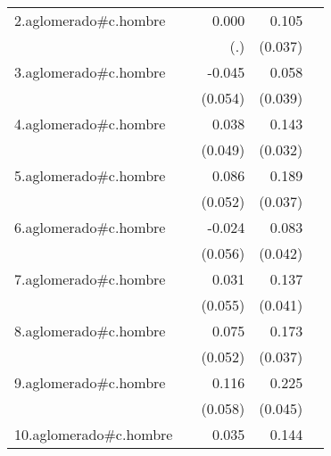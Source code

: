 {\begin{longtable}{l*{4}{D{.}{.}{-1}}}
\addlinespace
2.aglomerado#c.hombre&                     &       0.000         &       0.105\sym{**} &                     \\
            &                     &         (.)         &     (0.037)         &                     \\
\addlinespace
3.aglomerado#c.hombre&                     &      -0.045         &       0.058         &                     \\
            &                     &     (0.054)         &     (0.039)         &                     \\
\addlinespace
4.aglomerado#c.hombre&                     &       0.038         &       0.143\sym{***}&                     \\
            &                     &     (0.049)         &     (0.032)         &                     \\
\addlinespace
5.aglomerado#c.hombre&                     &       0.086         &       0.189\sym{***}&                     \\
            &                     &     (0.052)         &     (0.037)         &                     \\
\addlinespace
6.aglomerado#c.hombre&                     &      -0.024         &       0.083\sym{*}  &                     \\
            &                     &     (0.056)         &     (0.042)         &                     \\
\addlinespace
7.aglomerado#c.hombre&                     &       0.031         &       0.137\sym{***}&                     \\
            &                     &     (0.055)         &     (0.041)         &                     \\
\addlinespace
8.aglomerado#c.hombre&                     &       0.075         &       0.173\sym{***}&                     \\
            &                     &     (0.052)         &     (0.037)         &                     \\
\addlinespace
9.aglomerado#c.hombre&                     &       0.116\sym{*}  &       0.225\sym{***}&                     \\
            &                     &     (0.058)         &     (0.045)         &                     \\
\addlinespace
10.aglomerado#c.hombre&                     &       0.035         &       0.144\sym{***}&                     \\

\end{longtable}}
